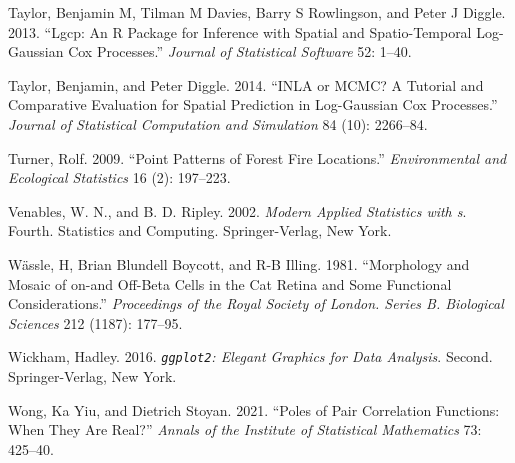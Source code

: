 \begin{CSLReferences}{1}{0}
\leavevmode{}%
Taylor, Benjamin M, Tilman M Davies, Barry S Rowlingson, and Peter J Diggle. 2013. {``Lgcp: An {R} Package for Inference with Spatial and Spatio-Temporal Log-{G}aussian {C}ox Processes.''} \emph{Journal of Statistical Software} 52: 1--40.

\leavevmode{}%
Taylor, Benjamin, and Peter Diggle. 2014. {``{INLA} or {MCMC}? A Tutorial and Comparative Evaluation for Spatial Prediction in Log-{G}aussian {C}ox Processes.''} \emph{Journal of Statistical Computation and Simulation} 84 (10): 2266--84.

\leavevmode{}%
Turner, Rolf. 2009. {``Point Patterns of Forest Fire Locations.''} \emph{Environmental and Ecological Statistics} 16 (2): 197--223.

\leavevmode{}%
Venables, W. N., and B. D. Ripley. 2002. \emph{Modern Applied Statistics with s}. Fourth. Statistics and Computing. Springer-Verlag, New York.

\leavevmode{}%
Wässle, H, Brian Blundell Boycott, and R-B Illing. 1981. {``Morphology and Mosaic of on-and Off-Beta Cells in the Cat Retina and Some Functional Considerations.''} \emph{Proceedings of the Royal Society of London. Series B. Biological Sciences} 212 (1187): 177--95.

\leavevmode{}%
Wickham, Hadley. 2016. \emph{\texttt{ggplot2}: Elegant Graphics for Data Analysis}. Second. Springer-Verlag, New York.

\leavevmode{}%
Wong, Ka Yiu, and Dietrich Stoyan. 2021. {``Poles of Pair Correlation Functions: When They Are Real?''} \emph{Annals of the Institute of Statistical Mathematics} 73: 425--40.

\end{CSLReferences}



\address{%
Jonatan A. González\\
King Abdullah University of Science and Technology (KAUST)\\%
Computer, Electrical and Mathematical Sciences and Engineering Division\\ Thuwal, 23955-6900, Saudi Arabia\\
%
%
\textit{ORCiD: \href{https://orcid.org/0000-0002-2296-5271}{0000-0002-2296-5271}}\\%
\href{mailto:jonathan.gonzalez@kaust.edu.sa}{\nolinkurl{jonathan.gonzalez@kaust.edu.sa}}%
}


